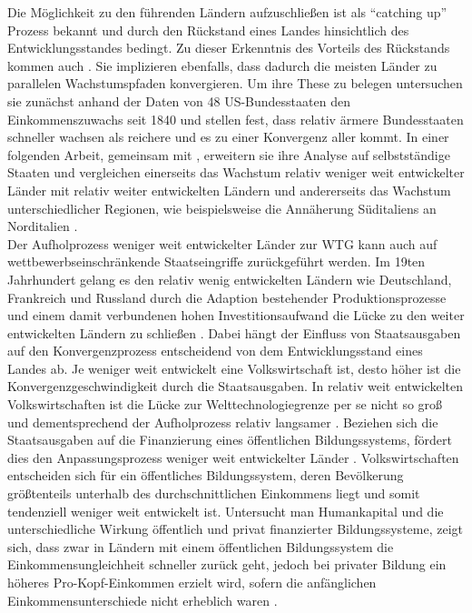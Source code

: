 Die Möglichkeit zu den führenden Ländern aufzuschließen ist als "`catching up"' Prozess bekannt und durch den Rückstand eines Landes hinsichtlich des Entwicklungsstandes bedingt. Zu dieser Erkenntnis des Vorteils des Rückstands kommen auch \cite{Barro.1990,Barro.1991,Barro.1992}. Sie implizieren ebenfalls, dass dadurch die meisten Länder zu parallelen Wachstumspfaden konvergieren. Um ihre These zu belegen untersuchen sie zunächst anhand der Daten von 48 US-Bundesstaaten den Einkommenszuwachs seit 1840 und stellen fest, dass relativ ärmere Bundesstaaten schneller wachsen als reichere und es zu einer Konvergenz aller kommt. In einer folgenden Arbeit, gemeinsam mit \cite{Blanchard.1989}, erweitern sie ihre Analyse auf selbstständige Staaten und vergleichen einerseits das Wachstum relativ weniger weit entwickelter Länder mit relativ weiter entwickelten Ländern und andererseits das Wachstum unterschiedlicher Regionen, wie beispielsweise die Annäherung Süditaliens an Norditalien \cite{Barro.1992}.\\
%
Der Aufholprozess weniger weit entwickelter Länder zur WTG kann auch auf wettbewerbseinschränkende Staatseingriffe zurückgeführt werden. Im 19ten Jahrhundert gelang es den relativ wenig entwickelten Ländern wie Deutschland, Frankreich und Russland durch die Adaption bestehender Produktionsprozesse und einem damit verbundenen hohen Investitionsaufwand die Lücke zu den weiter entwickelten Ländern zu schließen \cite{Gerschenkron.1962}. Dabei hängt der Einfluss von Staatsausgaben auf den Konvergenzprozess entscheidend von dem Entwicklungsstand eines Landes ab. Je weniger weit entwickelt eine Volkswirtschaft ist, desto höher ist die Konvergenzgeschwindigkeit durch die Staatsausgaben. In relativ weit entwickelten Volkswirtschaften ist die Lücke zur Welttechnologiegrenze per se nicht so groß und dementsprechend der Aufholprozess relativ langsamer \cite{Ott.2011}. 
Beziehen sich die Staatsausgaben auf die Finanzierung eines öffentlichen Bildungssystems, fördert dies den Anpassungsprozess weniger weit entwickelter Länder \cite{Glomm.1992}. Volkswirtschaften entscheiden sich für ein öffentliches Bildungssystem, deren Bevölkerung größtenteils unterhalb des durchschnittlichen Einkommens liegt und somit tendenziell weniger weit entwickelt ist.
Untersucht man Humankapital und die unterschiedliche Wirkung öffentlich und privat finanzierter Bildungssysteme, zeigt sich, dass zwar in Ländern mit einem öffentlichen Bildungssystem die Einkommensungleichheit schneller zurück geht, jedoch bei privater Bildung ein höheres Pro-Kopf-Einkommen erzielt wird, sofern die anfänglichen Einkommensunterschiede nicht erheblich waren \cite{Glomm.1992}.\\
